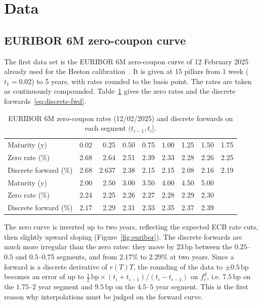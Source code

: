 \documentclass[11pt,a4paper]{article}
\theoremstyle{plain}
\theoremstyle{definition}
\newcommand{\bp}{\,\mathrm{bp}}
\begin{document}
\clearpage
\section{Data}
\label{sec:data}

\subsection{EURIBOR 6M zero-coupon curve}
The first data set is the EURIBOR 6M zero-coupon curve of 12 February 2025 already used for the Heston calibration~\cite{data}. It is given at 15 pillars from 1 week ($t_1=0.02$) to 5 years, with rates rounded to the basis point. The rates are taken as continuously compounded. Table~\ref{tab:euribor} gives the zero rates and the discrete forwards~\eqref{eq:discrete-fwd}.

\begin{table}[htbp]
\centering
\small
\begin{tabular}{@{}lrrrrrrrr@{}}
\toprule
Maturity (y) & 0.02 & 0.25 & 0.50 & 0.75 & 1.00 & 1.25 & 1.50 & 1.75 \\
Zero rate (\%) & 2.68 & 2.64 & 2.51 & 2.39 & 2.33 & 2.28 & 2.26 & 2.25 \\
Discrete forward (\%) & 2.68 & 2.637 & 2.38 & 2.15 & 2.15 & 2.08 & 2.16 & 2.19 \\
\midrule
Maturity (y) & 2.00 & 2.50 & 3.00 & 3.50 & 4.00 & 4.50 & 5.00 & \\
Zero rate (\%) & 2.24 & 2.25 & 2.26 & 2.27 & 2.28 & 2.29 & 2.30 & \\
Discrete forward (\%) & 2.17 & 2.29 & 2.31 & 2.33 & 2.35 & 2.37 & 2.39 & \\
\bottomrule
\end{tabular}
\caption{EURIBOR 6M zero-coupon rates (12/02/2025) and discrete forwards on each segment $(t_{i-1},t_i]$.}
\label{tab:euribor}
\end{table}

The zero curve is inverted up to two years, reflecting the expected ECB rate cuts, then slightly upward sloping (Figure~\ref{fig:euribor}). The discrete forwards are much more irregular than the zero rates: they move by $23\bp$ between the $0.25$--$0.5$ and $0.5$--$0.75$ segments, and from $2.17\%$ to $2.29\%$ at two years. Since a forward is a discrete derivative of $r(T)T$, the rounding of the data to $\pm0.5\bp$ becomes an error of up to $\frac12\bp\times(t_i+t_{i-1})/(t_i-t_{i-1})$ on $f^d_i$, i.e. $7.5\bp$ on the $1.75$--$2$ year segment and $9.5\bp$ on the $4.5$--$5$ year segment. This is the first reason why interpolations must be judged on the forward curve.
\end{document}

